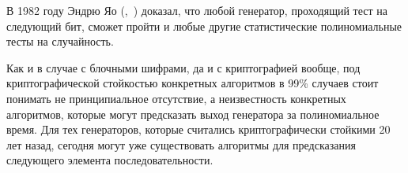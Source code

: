 В 1982 году Эндрю Яо (,~\cite{Yao:1982}) доказал, что любой генератор, проходящий тест на следующий бит, сможет пройти и любые другие статистические полиномиальные тесты на случайность.

Как и в случае с блочными шифрами, да и с криптографией вообще, под криптографической стойкостью конкретных алгоритмов в 99\% случаев стоит понимать не принципиальное отсутствие, а неизвестность конкретных алгоритмов, которые могут предсказать выход генератора за полиномиальное время. Для тех генераторов, которые считались криптографически стойкими 20 лет назад, сегодня могут уже существовать алгоритмы для предсказания следующего элемента последовательности.